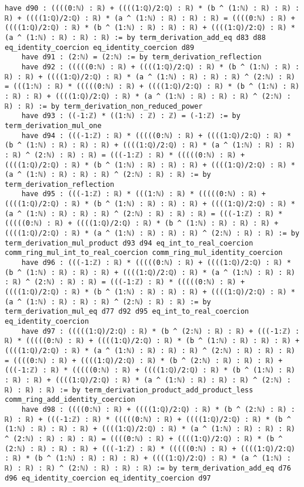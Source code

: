 \documentclass{article}
\begin{document}
\begin{tcolorbox}[colback=white!10, width=\linewidth]
\begin{lstlisting}[language=Lean4]
    have d90 : ((((0:ℕ) : ℝ) + ((((1:ℚ)/2:ℚ) : ℝ) * (b ^ (1:ℕ) : ℝ) : ℝ) : ℝ) + ((((1:ℚ)/2:ℚ) : ℝ) * (a ^ (1:ℕ) : ℝ) : ℝ) : ℝ) = ((((0:ℕ) : ℝ) + ((((1:ℚ)/2:ℚ) : ℝ) * (b ^ (1:ℕ) : ℝ) : ℝ) : ℝ) + ((((1:ℚ)/2:ℚ) : ℝ) * (a ^ (1:ℕ) : ℝ) : ℝ) : ℝ) := by term_derivation_add_eq d83 d88 eq_identity_coercion eq_identity_coercion d89
    have d91 : (2:ℕ) = (2:ℕ) := by term_derivation_reflection
    have d92 : (((((0:ℕ) : ℝ) + ((((1:ℚ)/2:ℚ) : ℝ) * (b ^ (1:ℕ) : ℝ) : ℝ) : ℝ) + ((((1:ℚ)/2:ℚ) : ℝ) * (a ^ (1:ℕ) : ℝ) : ℝ) : ℝ) ^ (2:ℕ) : ℝ) = (((1:ℕ) : ℝ) * (((((0:ℕ) : ℝ) + ((((1:ℚ)/2:ℚ) : ℝ) * (b ^ (1:ℕ) : ℝ) : ℝ) : ℝ) + ((((1:ℚ)/2:ℚ) : ℝ) * (a ^ (1:ℕ) : ℝ) : ℝ) : ℝ) ^ (2:ℕ) : ℝ) : ℝ) := by term_derivation_non_reduced_power
    have d93 : ((-1:ℤ) * ((1:ℕ) : ℤ) : ℤ) = (-1:ℤ) := by term_derivation_mul_one
    have d94 : (((-1:ℤ) : ℝ) * (((((0:ℕ) : ℝ) + ((((1:ℚ)/2:ℚ) : ℝ) * (b ^ (1:ℕ) : ℝ) : ℝ) : ℝ) + ((((1:ℚ)/2:ℚ) : ℝ) * (a ^ (1:ℕ) : ℝ) : ℝ) : ℝ) ^ (2:ℕ) : ℝ) : ℝ) = (((-1:ℤ) : ℝ) * (((((0:ℕ) : ℝ) + ((((1:ℚ)/2:ℚ) : ℝ) * (b ^ (1:ℕ) : ℝ) : ℝ) : ℝ) + ((((1:ℚ)/2:ℚ) : ℝ) * (a ^ (1:ℕ) : ℝ) : ℝ) : ℝ) ^ (2:ℕ) : ℝ) : ℝ) := by term_derivation_reflection
    have d95 : (((-1:ℤ) : ℝ) * (((1:ℕ) : ℝ) * (((((0:ℕ) : ℝ) + ((((1:ℚ)/2:ℚ) : ℝ) * (b ^ (1:ℕ) : ℝ) : ℝ) : ℝ) + ((((1:ℚ)/2:ℚ) : ℝ) * (a ^ (1:ℕ) : ℝ) : ℝ) : ℝ) ^ (2:ℕ) : ℝ) : ℝ) : ℝ) = (((-1:ℤ) : ℝ) * (((((0:ℕ) : ℝ) + ((((1:ℚ)/2:ℚ) : ℝ) * (b ^ (1:ℕ) : ℝ) : ℝ) : ℝ) + ((((1:ℚ)/2:ℚ) : ℝ) * (a ^ (1:ℕ) : ℝ) : ℝ) : ℝ) ^ (2:ℕ) : ℝ) : ℝ) := by term_derivation_mul_product d93 d94 eq_int_to_real_coercion comm_ring_mul_int_to_real_coercion comm_ring_mul_identity_coercion
    have d96 : (((-1:ℤ) : ℝ) * (((((0:ℕ) : ℝ) + ((((1:ℚ)/2:ℚ) : ℝ) * (b ^ (1:ℕ) : ℝ) : ℝ) : ℝ) + ((((1:ℚ)/2:ℚ) : ℝ) * (a ^ (1:ℕ) : ℝ) : ℝ) : ℝ) ^ (2:ℕ) : ℝ) : ℝ) = (((-1:ℤ) : ℝ) * (((((0:ℕ) : ℝ) + ((((1:ℚ)/2:ℚ) : ℝ) * (b ^ (1:ℕ) : ℝ) : ℝ) : ℝ) + ((((1:ℚ)/2:ℚ) : ℝ) * (a ^ (1:ℕ) : ℝ) : ℝ) : ℝ) ^ (2:ℕ) : ℝ) : ℝ) := by term_derivation_mul_eq d77 d92 d95 eq_int_to_real_coercion eq_identity_coercion
    have d97 : (((((1:ℚ)/2:ℚ) : ℝ) * (b ^ (2:ℕ) : ℝ) : ℝ) + (((-1:ℤ) : ℝ) * (((((0:ℕ) : ℝ) + ((((1:ℚ)/2:ℚ) : ℝ) * (b ^ (1:ℕ) : ℝ) : ℝ) : ℝ) + ((((1:ℚ)/2:ℚ) : ℝ) * (a ^ (1:ℕ) : ℝ) : ℝ) : ℝ) ^ (2:ℕ) : ℝ) : ℝ) : ℝ) = ((((0:ℕ) : ℝ) + ((((1:ℚ)/2:ℚ) : ℝ) * (b ^ (2:ℕ) : ℝ) : ℝ) : ℝ) + (((-1:ℤ) : ℝ) * (((((0:ℕ) : ℝ) + ((((1:ℚ)/2:ℚ) : ℝ) * (b ^ (1:ℕ) : ℝ) : ℝ) : ℝ) + ((((1:ℚ)/2:ℚ) : ℝ) * (a ^ (1:ℕ) : ℝ) : ℝ) : ℝ) ^ (2:ℕ) : ℝ) : ℝ) : ℝ) := by term_derivation_product_add_product_less comm_ring_add_identity_coercion
    have d98 : ((((0:ℕ) : ℝ) + ((((1:ℚ)/2:ℚ) : ℝ) * (b ^ (2:ℕ) : ℝ) : ℝ) : ℝ) + (((-1:ℤ) : ℝ) * (((((0:ℕ) : ℝ) + ((((1:ℚ)/2:ℚ) : ℝ) * (b ^ (1:ℕ) : ℝ) : ℝ) : ℝ) + ((((1:ℚ)/2:ℚ) : ℝ) * (a ^ (1:ℕ) : ℝ) : ℝ) : ℝ) ^ (2:ℕ) : ℝ) : ℝ) : ℝ) = ((((0:ℕ) : ℝ) + ((((1:ℚ)/2:ℚ) : ℝ) * (b ^ (2:ℕ) : ℝ) : ℝ) : ℝ) + (((-1:ℤ) : ℝ) * (((((0:ℕ) : ℝ) + ((((1:ℚ)/2:ℚ) : ℝ) * (b ^ (1:ℕ) : ℝ) : ℝ) : ℝ) + ((((1:ℚ)/2:ℚ) : ℝ) * (a ^ (1:ℕ) : ℝ) : ℝ) : ℝ) ^ (2:ℕ) : ℝ) : ℝ) : ℝ) := by term_derivation_add_eq d76 d96 eq_identity_coercion eq_identity_coercion d97

\end{lstlisting}
\end{tcolorbox}
\end{document}
